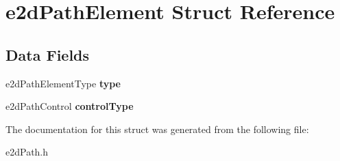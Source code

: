 \hypertarget{structe2dPathElement}{\section{e2d\-Path\-Element Struct Reference}
\label{structe2dPathElement}
}
\subsection*{Data Fields}
\begin{DoxyCompactItemize}
\item 
\hypertarget{structe2dPathElement_acb2ed01d1856b82777314d8eb8f66b01}{e2d\-Path\-Element\-Type {\bfseries type}}\label{structe2dPathElement_acb2ed01d1856b82777314d8eb8f66b01}

\item 
\hypertarget{structe2dPathElement_a88af317c0c6d0deb1aacb6cc1acd441d}{e2d\-Path\-Control {\bfseries control\-Type}}\label{structe2dPathElement_a88af317c0c6d0deb1aacb6cc1acd441d}

\end{DoxyCompactItemize}


The documentation for this struct was generated from the following file\-:\begin{DoxyCompactItemize}
\item 
e2d\-Path.\-h\end{DoxyCompactItemize}
